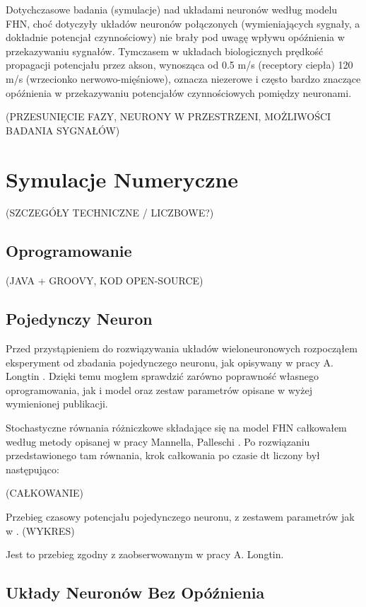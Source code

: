 \documentclass[12pt]{article}
\begin{document}
  Dotychczasowe badania (symulacje) nad układami neuronów według modelu FHN, choć dotyczyły układów neuronów połączonych (wymieniających sygnały, a dokładnie potencjał czynnościowy) nie brały pod uwagę wpływu opóźnienia w przekazywaniu sygnałów. Tymczasem w układach biologicznych prędkość propagacji potencjału przez akson, wynosząca od 0.5 m/s (receptory ciepła) 120 m/s (wrzecionko nerwowo-mięśniowe), oznacza niezerowe i często bardzo znaczące opóźnienia w przekazywaniu potencjałów czynnościowych pomiędzy neuronami.
  
  (PRZESUNIĘCIE FAZY, NEURONY W PRZESTRZENI, MOŻLIWOŚCI BADANIA SYGNAŁÓW)
  
  
  \section{Symulacje Numeryczne}
  
  (SZCZEGÓŁY TECHNICZNE / LICZBOWE?)
  
  
  \subsection{Oprogramowanie}
  
  (JAVA + GROOVY, KOD OPEN-SOURCE)
  
  \subsection{Pojedynczy Neuron}
  
  Przed przystąpieniem do rozwiązywania układów wieloneuronowych rozpocząłem eksperyment od zbadania pojedynczego neuronu, jak opisywany w pracy A. Longtin \cite{longtin}. Dzięki temu mogłem sprawdzić zarówno poprawność własnego oprogramowania, jak i model oraz zestaw parametrów opisane w wyżej wymienionej publikacji.
  
  Stochastyczne równania różniczkowe składające się na model FHN całkowałem według metody opisanej w pracy Mannella, Palleschi \cite{mannella}. Po rozwiązaniu przedstawionego tam równania, krok całkowania po czasie dt liczony był następująco:
  
  (CAŁKOWANIE)
  
  Przebieg czasowy potencjału pojedynczego neuronu, z zestawem parametrów jak w \cite{longtin}.
  (WYKRES)
  
  Jest to przebieg zgodny z zaobserwowanym w pracy A. Longtin.
  
  \subsection{Układy Neuronów Bez Opóźnienia}
  
\end{document}
